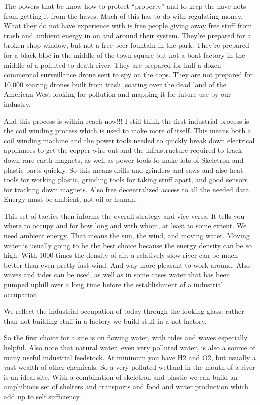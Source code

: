 The powers that be know how to protect ``property'' and to keep the have
nots from getting it from the haves. Much of this has to do with
regulating money. What they do not have experience with is free people
giving away free stuff from trash and ambient energy in on and around
their system. They're prepared for a broken shop window, but not a free
beer fountain in the park. They're prepared for a black bloc in the
middle of the town square but not a boat factory in the middle of a
polluted-to-death river. They are prepared for half a dozen commercial
surveillance drone sent to spy on the cops. They are not prepared for
10,000 soaring drones built from trash, soaring over the dead land of
the American West looking for pollution and mapping it for future use by
our industry.

And this process is within reach now!!! I still think the first
industrial process is the coil winding process which is used to make
more of itself. This means both a coil winding machine and the power
tools needed to quickly break down electrical appliances to get the
copper wire out and the infrastructure required to track down rare earth
magnets, as well as power tools to make lots of Skeletron and plastic
parts quickly. So this means drills and grinders and saws and also heat
tools for working plastic, grinding tools for taking stuff apart, and
good sensors for tracking down magnets. Also free decentralized access
to all the needed data. Energy must be ambient, not oil or human.

This set of tactics then informs the overall strategy and vice versa. It
tells you where to occupy and for how long and with whom, at least to
some extent. We need ambient energy. That means the sun, the wind, and
moving water. Moving water is usually going to be the best choice
because the energy density can be so high. With 1000 times the density
of air, a relatively slow river can be much better than even pretty fast
wind. And way more pleasant to work around. Also waves and tides can be
used, as well as in some cases water that has been pumped uphill over a
long time before the establishment of a industrial occupation.

We reflect the industrial occupation of today through the looking glass:
rather than not building stuff in a factory we build stuff in a
not-factory.

So the first choice for a site is on flowing water, with tides and waves
especially helpful. Also note that natural water, even very polluted
water, is also a source of many useful industrial feedstock. At minimum
you have H2 and O2, but usually a vast wealth of other chemicals. So a
very polluted wetland in the mouth of a river is an ideal site. With a
combination of skeletron and plastic we can build an amphibious set of
shelters and transports and food and water production which add up to
self sufficiency.

